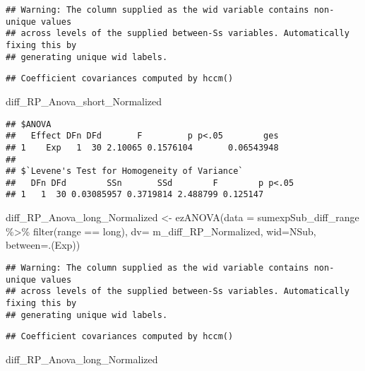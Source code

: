 \documentclass[
]{article}
\newenvironment{Shaded}{\begin{snugshade}}{\end{snugshade}}
\newcommand{\AttributeTok}[1]{\textcolor[rgb]{0.77,0.63,0.00}{#1}}
\newcommand{\FunctionTok}[1]{\textcolor[rgb]{0.00,0.00,0.00}{#1}}
\newcommand{\NormalTok}[1]{#1}
\newcommand{\OtherTok}[1]{\textcolor[rgb]{0.56,0.35,0.01}{#1}}
\newcommand{\SpecialCharTok}[1]{\textcolor[rgb]{0.00,0.00,0.00}{#1}}
\newcommand{\StringTok}[1]{\textcolor[rgb]{0.31,0.60,0.02}{#1}}
\begin{document}
\begin{verbatim}
## Warning: The column supplied as the wid variable contains non-unique values
## across levels of the supplied between-Ss variables. Automatically fixing this by
## generating unique wid labels.
\end{verbatim}

\begin{verbatim}
## Coefficient covariances computed by hccm()
\end{verbatim}

\begin{Shaded}
\begin{Highlighting}[]
\NormalTok{diff\_RP\_Anova\_short\_Normalized}
\end{Highlighting}
\end{Shaded}

\begin{verbatim}
## $ANOVA
##   Effect DFn DFd       F         p p<.05        ges
## 1    Exp   1  30 2.10065 0.1576104       0.06543948
## 
## $`Levene's Test for Homogeneity of Variance`
##   DFn DFd        SSn       SSd        F        p p<.05
## 1   1  30 0.03085957 0.3719814 2.488799 0.125147
\end{verbatim}

\begin{Shaded}
\begin{Highlighting}[]
\NormalTok{diff\_RP\_Anova\_long\_Normalized }\OtherTok{\textless{}{-}} \FunctionTok{ezANOVA}\NormalTok{(}\AttributeTok{data =}\NormalTok{ sumexpSub\_diff\_range }\SpecialCharTok{\%\textgreater{}\%} \FunctionTok{filter}\NormalTok{(range }\SpecialCharTok{==} \StringTok{\textquotesingle{}long\textquotesingle{}}\NormalTok{), }\AttributeTok{dv=}\NormalTok{ m\_diff\_RP\_Normalized, }\AttributeTok{wid=}\NormalTok{NSub, }\AttributeTok{between=}\NormalTok{.(Exp))}
\end{Highlighting}
\end{Shaded}

\begin{verbatim}
## Warning: The column supplied as the wid variable contains non-unique values
## across levels of the supplied between-Ss variables. Automatically fixing this by
## generating unique wid labels.
\end{verbatim}

\begin{verbatim}
## Coefficient covariances computed by hccm()
\end{verbatim}

\begin{Shaded}
\begin{Highlighting}[]
\NormalTok{diff\_RP\_Anova\_long\_Normalized}
\end{Highlighting}
\end{Shaded}
\end{document}
